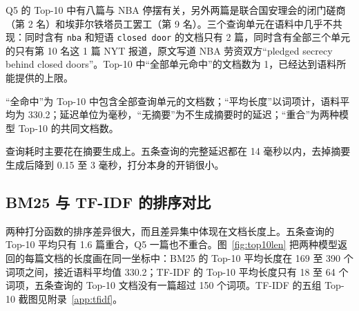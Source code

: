 \documentclass[12pt,a4paper]{ctexart}
\begin{document}
Q5 的 Top-10 中有八篇与 NBA 停摆有关，另外两篇是联合国安理会的闭门磋商（第 2 名）和埃菲尔铁塔员工罢工（第 9 名）。三个查询单元在语料中几乎不共现：同时含有 \texttt{nba} 和短语 \texttt{closed door} 的文档只有 2 篇，同时含有全部三个单元的只有第 10 名这 1 篇 NYT 报道，原文写道 NBA 劳资双方“pledged secrecy behind closed doors”。Top-10 中“全部单元命中”的文档数为 1，已经达到语料所能提供的上限。

\begin{table}[H]
\centering
\caption{五条测试查询的观察量（Top-10，延迟为 20 次执行的中位数）}
\label{tab:queries}

\vspace{0.4em}
\parbox{0.95\textwidth}{\footnotesize “全命中”为 Top-10 中包含全部查询单元的文档数；“平均长度”以词项计，语料平均为 330.2；延迟单位为毫秒，“无摘要”为不生成摘要时的延迟；“重合”为两种模型 Top-10 的共同文档数。}
\end{table}

查询耗时主要花在摘要生成上。五条查询的完整延迟都在 14 毫秒以内，去掉摘要生成后降到 0.15 至 3 毫秒，打分本身的开销很小。

\subsection{BM25 与 TF-IDF 的排序对比}

两种打分函数的排序差异很大，而且差异集中体现在文档长度上。五条查询的 Top-10 平均只有 1.6 篇重合，Q5 一篇也不重合。图~\ref{fig:top10len} 把两种模型返回的每篇文档的长度画在同一坐标中：BM25 的 Top-10 平均长度在 169 至 390 个词项之间，接近语料平均值 330.2；TF-IDF 的 Top-10 平均长度只有 18 至 64 个词项，五条查询的 Top-10 文档没有一篇超过 150 个词项。TF-IDF 的五组 Top-10 截图见附录~\ref{app:tfidf}。
\end{document}
